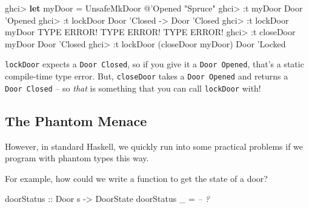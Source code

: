 \documentclass[]{article}
\newenvironment{Shaded}{}{}
\newcommand{\CommentTok}[1]{\textcolor[rgb]{0.38,0.63,0.69}{\textit{#1}}}
\newcommand{\DataTypeTok}[1]{\textcolor[rgb]{0.56,0.13,0.00}{#1}}
\newcommand{\FunctionTok}[1]{\textcolor[rgb]{0.02,0.16,0.49}{#1}}
\newcommand{\KeywordTok}[1]{\textcolor[rgb]{0.00,0.44,0.13}{\textbf{#1}}}
\newcommand{\NormalTok}[1]{#1}
\newcommand{\OtherTok}[1]{\textcolor[rgb]{0.00,0.44,0.13}{#1}}
\newcommand{\StringTok}[1]{\textcolor[rgb]{0.25,0.44,0.63}{#1}}
\begin{document}
\begin{Shaded}
\begin{Highlighting}[]
\NormalTok{ghci}\FunctionTok{>} \KeywordTok{let}\NormalTok{ myDoor }\FunctionTok{=} \DataTypeTok{UnsafeMkDoor} \FunctionTok{@}\NormalTok{'}\DataTypeTok{Opened} \StringTok{"Spruce"}
\NormalTok{ghci}\FunctionTok{>} \FunctionTok{:}\NormalTok{t myDoor}
\DataTypeTok{Door}\NormalTok{ '}\DataTypeTok{Opened}
\NormalTok{ghci}\FunctionTok{>} \FunctionTok{:}\NormalTok{t lockDoor}
\DataTypeTok{Door}\NormalTok{ '}\DataTypeTok{Closed} \OtherTok{->} \DataTypeTok{Door}\NormalTok{ '}\DataTypeTok{Closed}
\NormalTok{ghci}\FunctionTok{>} \FunctionTok{:}\NormalTok{t lockDoor myDoor}
\DataTypeTok{TYPE} \DataTypeTok{ERROR}\FunctionTok{!}  \DataTypeTok{TYPE} \DataTypeTok{ERROR}\FunctionTok{!}  \DataTypeTok{TYPE} \DataTypeTok{ERROR}\FunctionTok{!}
\NormalTok{ghci}\FunctionTok{>} \FunctionTok{:}\NormalTok{t closeDoor myDoor}
\DataTypeTok{Door}\NormalTok{ '}\DataTypeTok{Closed}
\NormalTok{ghci}\FunctionTok{>} \FunctionTok{:}\NormalTok{t lockDoor (closeDoor myDoor)}
\DataTypeTok{Door}\NormalTok{ '}\DataTypeTok{Locked}
\end{Highlighting}
\end{Shaded}

\texttt{lockDoor} expects a \texttt{Door\ \textquotesingle{}Closed}, so if you
give it a \texttt{Door\ \textquotesingle{}Opened}, that's a static compile-time
type error. But, \texttt{closeDoor} takes a
\texttt{Door\ \textquotesingle{}Opened} and returns a
\texttt{Door\ \textquotesingle{}Closed} -- so \emph{that} is something that you
can call \texttt{lockDoor} with!

\hypertarget{the-phantom-menace}{%
\subsection{The Phantom Menace}\label{the-phantom-menace}}

However, in standard Haskell, we quickly run into some practical problems if we
program with phantom types this way.

For example, how could we write a function to get the state of a door?

\begin{Shaded}
\begin{Highlighting}[]
\OtherTok{doorStatus ::} \DataTypeTok{Door}\NormalTok{ s }\OtherTok{->} \DataTypeTok{DoorState}
\NormalTok{doorStatus _ }\FunctionTok{=} \CommentTok{-- ?}
\end{Highlighting}
\end{Shaded}
\end{document}
